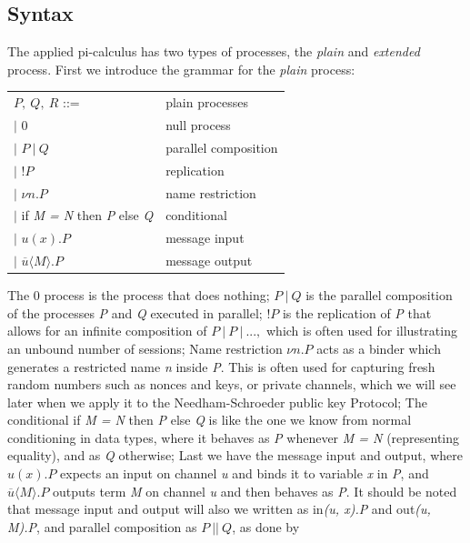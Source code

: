 \subsection{Syntax}
The applied pi-calculus has two types of processes, the \textit{plain} and \textit{extended} process. First we introduce the grammar for the \textit{plain} process:  %
\begin{center}
	\begin{tabular} { l l }
 		$P,\ Q,\ R$ ::= & plain processes \\ 
 		\quad $|$ 0 & null process \\  
 		\quad $|$ $P\ |\ Q$ & parallel composition \\
 		\quad $|$ !$P$ & replication \\
		\quad $|$ $\nu n.P$ & name restriction \\
		\quad $|$ if \textit{M = N} then \textit{P} else \textit{Q} & conditional \\
		\quad $|$ $u(x).P$ & message input \\
		\quad $|$ $\overline{u}\langle M\rangle .P $ & message output 
	\end{tabular}
\end{center}
The 0 process is the process that does nothing; $P\ |\ Q$ is the parallel composition of the processes \textit{P} and \textit{Q} executed in parallel; !$P$ is the replication of \textit{P} that allows for an infinite composition of $P\ |\ P\ |\ ...,$ which is often used for illustrating an unbound number of sessions; Name restriction $\nu n.P$ acts as a binder which generates a restricted name \textit{n} inside \textit{P}. This is often used for capturing fresh random numbers such as nonces and keys, or private channels, which we will see later when we apply it to the Needham-Schroeder public key Protocol; The conditional if \textit{M = N} then \textit{P} else \textit{Q} is like the one we know from normal conditioning in data types, where it behaves as \textit{P} whenever \textit{M = N} (representing equality), and as \textit{Q} otherwise; Last we have the message input and output, where $u(x).P$ expects an input on channel \textit{u} and binds it to variable \textit{x} in \textit{P}, and $\overline{u}\langle M\rangle .P $ outputs term \textit{M} on channel \textit{u} and then behaves as \textit{P}. It should be noted that message input and output will also we written as in\textit{(u, x).P} and out\textit{(u, M).P}, and parallel composition as $P\ ||\ Q$, as done by \citeauthor{DBLP:journals/ftpl/CortierK14} \\

